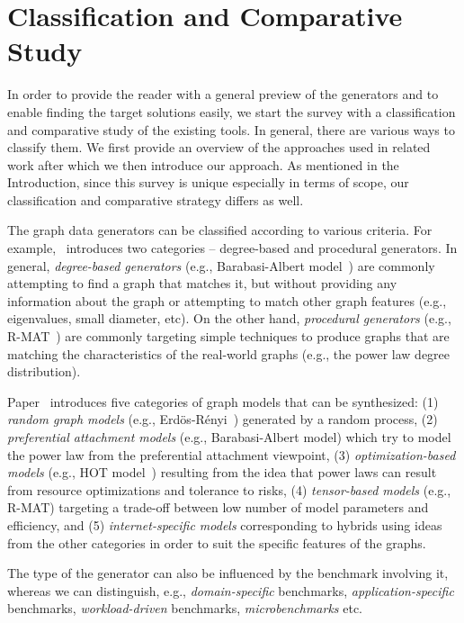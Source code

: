 \section{Classification and Comparative Study}
\label{sec:comparison}

In order to provide the reader with a general preview of the generators and  to enable finding the target solutions easily, we start the survey with a  classification and comparative study of the existing tools. In general, there are various ways to classify them. We first provide an overview of the approaches used in related work after which we then introduce our approach. As mentioned in the Introduction, since this survey is unique especially in terms of scope, our classification and comparative strategy differs as well.

The graph data generators can be classified according to various criteria. For example,~\cite{DBLP:conf/sdm/ChakrabartiZF04} introduces two categories -- degree-based and procedural generators. In general, \emph{degree-based generators} (e.g., Barabasi-Albert model~\cite{Barabasi99emergenceScaling}) are commonly attempting to find a graph that matches it, but without providing any information about the graph or attempting to match other graph features (e.g., eigenvalues, small diameter, etc). On the other hand, \emph{procedural generators} (e.g., R-MAT~\cite{DBLP:conf/sdm/ChakrabartiZF04}) are commonly targeting simple techniques to produce graphs that are matching the characteristics of the real-world graphs (e.g., the power law degree distribution).

Paper~\cite{Chakrabarti:2006:GML:1132952.1132954} introduces five categories of graph models that can be synthesized: (1) \emph{random graph models} (e.g., Erd\"{o}s-R\'{e}nyi~\cite{Erdos:1960}) generated by a random process, (2) \emph{preferential attachment models} (e.g., Barabasi-Albert model) which try to model the power law from the preferential attachment viewpoint, (3) \emph{optimization-based models} (e.g., HOT model~\cite{PhysRevLett.84.2529}) resulting from the idea that power laws can result from resource optimizations and tolerance to risks, (4) \emph{tensor-based models} (e.g., R-MAT) targeting a trade-off between low number of model parameters and efficiency, and (5) \emph{internet-specific models} corresponding to hybrids using ideas from the other categories in order to suit the specific features of the graphs.

The type of the generator can also be influenced by the benchmark involving it, whereas we can distinguish, e.g., \emph{domain-specific} benchmarks, \emph{application-specific} benchmarks, \emph{workload-driven} benchmarks,  \emph{microbenchmarks} etc.


